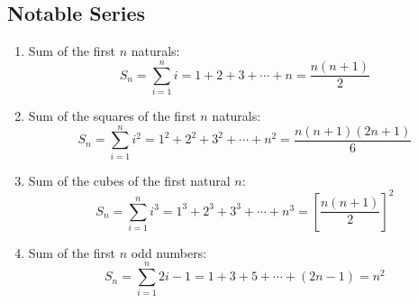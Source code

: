 \subsection{Notable Series}

\begin{enumerate}
    \item Sum of the first $n$ naturals:
    \[S_n = \sum_{i = 1}^n i = 1 + 2 + 3 + \cdots + n = \frac{n(n + 1)}{2}\]

    \item Sum of the squares of the first $n$ naturals:
    \[S_n = \sum_{i = 1}^n i^2 = 1^2 + 2^2 + 3^2 + \cdots + n^2 = \frac{n(n + 1)(2n + 1)}{6}\]

    \item Sum of the cubes of the first natural $n$:
    \[S_n = \sum_{i = 1}^n i^3 = 1^3 + 2^3 + 3^3 + \cdots + n^3 = \left[\frac{n(n + 1)}{2}\right]^2\]

    \item Sum of the first $n$ odd numbers:
    \[S_n = \sum_{i = 1}^n  2i - 1 = 1 + 3 + 5 + \cdots + (2n - 1) = n^2\]

\end{enumerate}
